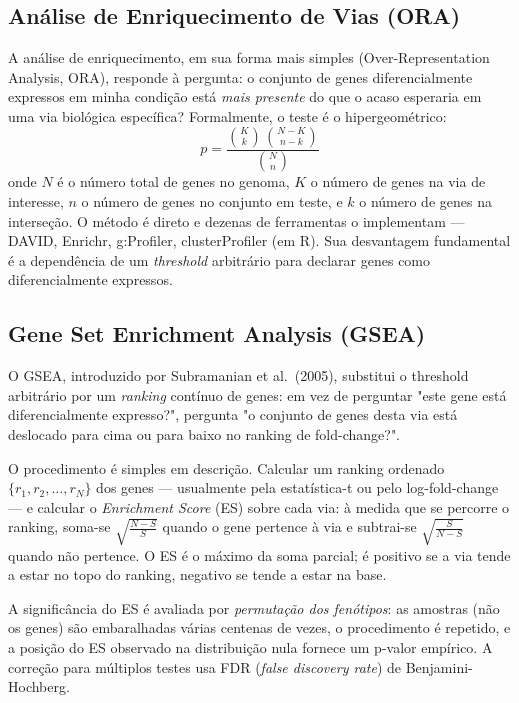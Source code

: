 \subsection{Análise de Enriquecimento de Vias (ORA)}
\label{sub:image11-ora}

A análise de enriquecimento, em sua forma mais simples (Over-Representation
Analysis, ORA), responde à pergunta: o conjunto de genes diferencialmente
expressos em minha condição está \emph{mais presente} do que o acaso
esperaria em uma via biológica específica? Formalmente, o teste é o
hipergeométrico:
\begin{equation}
p = \frac{\binom{K}{k}\,\binom{N - K}{n - k}}{\binom{N}{n}}
\end{equation}
onde $N$ é o número total de genes no genoma, $K$ o número de genes na via
de interesse, $n$ o número de genes no conjunto em teste, e $k$ o número
de genes na interseção. O método é direto e dezenas de ferramentas o
implementam --- DAVID, Enrichr, g:Profiler, clusterProfiler (em R). Sua
desvantagem fundamental é a dependência de um \emph{threshold} arbitrário
para declarar genes como diferencialmente expressos.

\subsection{Gene Set Enrichment Analysis (GSEA)}
\label{sub:image11-gsea}

O GSEA, introduzido por Subramanian et al.\ (2005), substitui o threshold
arbitrário por um \emph{ranking} contínuo de genes: em vez de perguntar
"este gene está diferencialmente expresso?", pergunta "o conjunto de genes
desta via está deslocado para cima ou para baixo no ranking de fold-change?".

O procedimento é simples em descrição. Calcular um ranking ordenado
$\{r_1, r_2, \dots, r_N\}$ dos genes --- usualmente pela estatística-t ou
pelo log-fold-change --- e calcular o \emph{Enrichment Score} (ES) sobre
cada via: à medida que se percorre o ranking, soma-se $\sqrt{\tfrac{N - S}{S}}$
quando o gene pertence à via e subtrai-se $\sqrt{\tfrac{S}{N - S}}$
quando não pertence. O ES é o máximo da soma parcial; é positivo se a via
tende a estar no topo do ranking, negativo se tende a estar na base.

A significância do ES é avaliada por \emph{permutação dos fenótipos}: as
amostras (não os genes) são embaralhadas várias centenas de vezes, o
procedimento é repetido, e a posição do ES observado na distribuição nula
fornece um p-valor empírico. A correção para múltiplos testes usa FDR
(\emph{false discovery rate}) de Benjamini-Hochberg.

